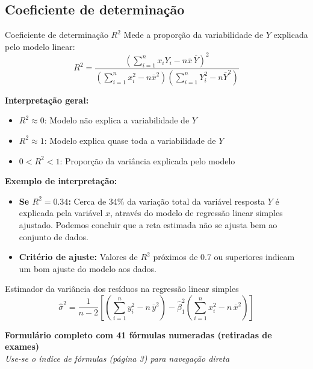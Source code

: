 \documentclass[a4paper,12pt]{article}
\begin{document}
\subsection{Coeficiente de determinação}

\begin{formulabox}{Coeficiente de determinação $R^2$}
Mede a proporção da variabilidade de $Y$ explicada pelo modelo linear:
\begin{equation}\label{formula40}\tag{Fórmula 40}
    R^2 = \frac{\left( \sum_{i=1}^n x_i Y_i - n \overline{x} \, \overline{Y} \right)^2}{\left( \sum_{i=1}^n x_i^2 - n \overline{x}^2 \right) \left( \sum_{i=1}^n Y_i^2 - n \overline{Y}^2 \right)}
\end{equation}

\textbf{Interpretação geral:}
\begin{itemize}
    \item $R^2 \approx 0$: Modelo não explica a variabilidade de $Y$
    \item $R^2 \approx 1$: Modelo explica quase toda a variabilidade de $Y$
    \item $0 < R^2 < 1$: Proporção da variância explicada pelo modelo
\end{itemize}

\textbf{Exemplo de interpretação:}
\begin{itemize}
    \item \textbf{Se $R^2 = 0.34$:} Cerca de 34\% da variação total da variável resposta $Y$ é explicada pela variável $x$, através do modelo de regressão linear simples ajustado. Podemos concluir que a reta estimada não se ajusta bem ao conjunto de dados.
    \item \textbf{Critério de ajuste:} Valores de $R^2$ próximos de 0.7 ou superiores indicam um bom ajuste do modelo aos dados.
\end{itemize}
\end{formulabox}

\begin{formulabox}{Estimador da variância dos resíduos na regressão linear simples}
\begin{equation}\label{formula41}\tag{Fórmula 41}
    \hat{\sigma}^2 = \frac{1}{n-2} \left[ \left( \sum_{i=1}^n y_i^2 - n\,\overline{y}^2 \right) - \hat{\beta}_1^2 \left( \sum_{i=1}^n x_i^2 - n\,\overline{x}^2 \right) \right]
\end{equation}
\end{formulabox}

\vfill
\begin{center}
\textbf{\large Formulário completo com 41 fórmulas numeradas (retiradas de exames)}\\
\textit{Use-se o índice de fórmulas (página 3) para navegação direta}
\end{center}
\end{document}
